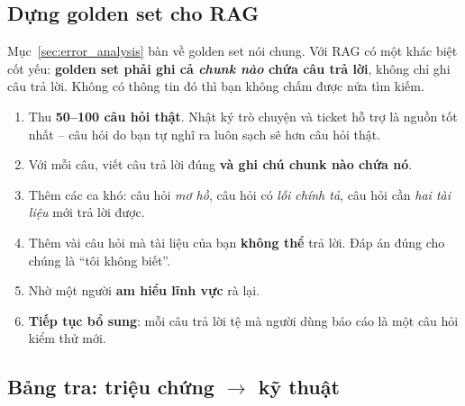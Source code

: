 \subsection{Dựng golden set cho RAG}
\label{ssec:rag_golden_set}

Mục~\ref{sec:error_analysis} bàn về golden set nói chung. Với RAG có một khác biệt cốt yếu: \textbf{golden set phải ghi cả \emph{chunk nào} chứa câu trả lời}, không chỉ ghi câu trả lời. Không có thông tin đó thì bạn không chấm được nửa tìm kiếm.

\begin{enumerate}
	\item Thu \textbf{50--100 câu hỏi thật}. Nhật ký trò chuyện và ticket hỗ trợ là nguồn tốt nhất -- câu hỏi do bạn tự nghĩ ra luôn sạch sẽ hơn câu hỏi thật.
	\item Với mỗi câu, viết câu trả lời đúng \textbf{và ghi chú chunk nào chứa nó}.
	\item Thêm các ca khó: câu hỏi \emph{mơ hồ}, câu hỏi có \emph{lỗi chính tả}, câu hỏi cần \emph{hai tài liệu} mới trả lời được.
	\item Thêm vài câu hỏi mà tài liệu của bạn \textbf{không thể} trả lời. Đáp án đúng cho chúng là “tôi không biết”.
	\item Nhờ một người \textbf{am hiểu lĩnh vực} rà lại.
	\item \textbf{Tiếp tục bổ sung}: mỗi câu trả lời tệ mà người dùng báo cáo là một câu hỏi kiểm thử mới.
\end{enumerate}

\subsection{Bảng tra: triệu chứng \texorpdfstring{$\rightarrow$}{->} kỹ thuật}
\label{ssec:rag_symptom_table}

